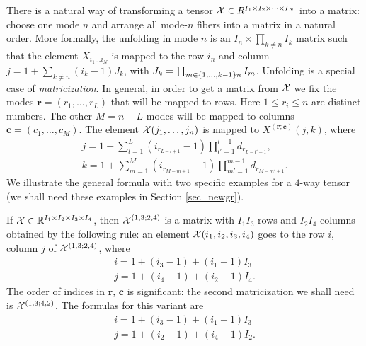 There is a natural way of transforming a tensor $\mathcal{X} \in R^{I_1 \times I_2 \times \cdots \times I_N}$ into a matrix: choose one mode $n$
and arrange all mode-$n$ fibers into a matrix in a natural order. More formally,
the unfolding in mode $n$ is an $I_n \times \prod_{k \neq n} I_k$ matrix such that
the element $X_{i_1 \dots i_N}$ is mapped to the row $i_n$ and column $j = 1 + \sum_{ k \neq n} (i_k - 1) J_k$,
with $J_k = \prod_{ m \in \{ 1, \dots, k-1 \} \\ {n} } I_m$.
 Unfolding  is a special case of \textit{matricization}. In general, in order to get a matrix
from $\mathcal{X}$ we fix the modes $\mathbf{r} =  (r_1, \dots, r_L)$ that will be mapped to rows.
Here $1 \leq r_i \leq n$ are distinct numbers. The other $M = n - L$  modes will be mapped
to columns $\mathbf{c} = (c_1, \dots, c_M)$.
The element $\mathcal{X}(j_1, \dots, j_n)$ is mapped to $X^{(\mathbf{r};\mathbf{c})}(j, k)$, where
\begin{eqnarray}
    j = 1 + \sum_{l = 1}^{L} ( i_{r_{L-l+1}} - 1) \prod_{l' = 1}^{l - 1} d_{r_{L - l' + 1}}, \\
    k = 1 + \sum_{m = 1}^{M} ( i_{r_{M-m+1}} - 1) \prod_{m' = 1}^{m - 1} d_{r_{M - m' + 1}}.
\end{eqnarray}
We illustrate the general formula with two specific examples
for a $4$-way tensor (we shall need these examples in Section \ref{sec_newgr}).

If $\mathcal{X} \in \mathbb{R}^{I_1 \times I_2 \times I_3 \times I_4}$, then $\mathcal{X}^{(1,3;2,4)}$ is a 
matrix with $I_1 I_3$ rows and $I_2 I_4$ columns obtained by the following rule:
an element $\mathcal{X}(i_1, i_2, i_3, i_4)$ goes to the row $i$, column $j$ of $\mathcal{X}^{(1,3;2,4)}$,
where 
\begin{eqnarray}
i = 1 + (i_3 - 1) + (i_1 -1) I_3 \\
j = 1 + (i_4 - 1) + (i_2 -1) I_4.
\end{eqnarray}
The order of indices in $\mathbf{r}$, $\mathbf{c}$ is significant: the second matricization
we shall need is $\mathcal{X}^{(1,3;4,2)}$. The formulas for this variant are
\begin{eqnarray}
i = 1 + (i_3 - 1) + (i_1 -1) I_3 \\
j = 1 + (i_2 - 1) + (i_4 -1) I_2 .
\end{eqnarray}



